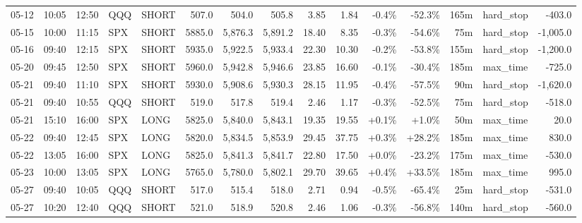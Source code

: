 \documentclass[11pt,a4paper,twoside]{article}
\begin{document}
\begin{landscape}
\begin{center}
\begin{longtable}{>{\color{txtmain}}l l l l l r r r r r r r r >{\color{txtmain}}l r}
05-12 & 10:05 & 12:50 & QQQ & SHORT & 507.0 & 504.0 & 505.8 & 3.85 & 1.84 & \textcolor{lossred}{-0.4\%} & \textcolor{lossred}{-52.3\%} & 165m & hard\_stop & \textcolor{lossred}{-403.0} \\
05-15 & 10:00 & 11:15 & SPX & SHORT & 5885.0 & 5,876.3 & 5,891.2 & 18.40 & 8.35 & \textcolor{lossred}{-0.3\%} & \textcolor{lossred}{-54.6\%} & 75m & hard\_stop & \textcolor{lossred}{-1,005.0} \\
05-16 & 09:40 & 12:15 & SPX & SHORT & 5935.0 & 5,922.5 & 5,933.4 & 22.30 & 10.30 & \textcolor{lossred}{-0.2\%} & \textcolor{lossred}{-53.8\%} & 155m & hard\_stop & \textcolor{lossred}{-1,200.0} \\
05-20 & 09:45 & 12:50 & SPX & SHORT & 5960.0 & 5,942.8 & 5,946.6 & 23.85 & 16.60 & \textcolor{lossred}{-0.1\%} & \textcolor{lossred}{-30.4\%} & 185m & max\_time & \textcolor{lossred}{-725.0} \\
05-21 & 09:40 & 11:10 & SPX & SHORT & 5930.0 & 5,908.6 & 5,930.3 & 28.15 & 11.95 & \textcolor{lossred}{-0.4\%} & \textcolor{lossred}{-57.5\%} & 90m & hard\_stop & \textcolor{lossred}{-1,620.0} \\
05-21 & 09:40 & 10:55 & QQQ & SHORT & 519.0 & 517.8 & 519.4 & 2.46 & 1.17 & \textcolor{lossred}{-0.3\%} & \textcolor{lossred}{-52.5\%} & 75m & hard\_stop & \textcolor{lossred}{-518.0} \\
05-21 & 15:10 & 16:00 & SPX & LONG & 5825.0 & 5,840.0 & 5,843.1 & 19.35 & 19.55 & \textcolor{wingreen}{+0.1\%} & \textcolor{wingreen}{+1.0\%} & 50m & max\_time & \textcolor{wingreen}{20.0} \\
05-22 & 09:40 & 12:45 & SPX & LONG & 5820.0 & 5,834.5 & 5,853.9 & 29.45 & 37.75 & \textcolor{wingreen}{+0.3\%} & \textcolor{wingreen}{+28.2\%} & 185m & max\_time & \textcolor{wingreen}{830.0} \\
05-22 & 13:05 & 16:00 & SPX & LONG & 5825.0 & 5,841.3 & 5,841.7 & 22.80 & 17.50 & \textcolor{wingreen}{+0.0\%} & \textcolor{lossred}{-23.2\%} & 175m & max\_time & \textcolor{lossred}{-530.0} \\
05-23 & 10:00 & 13:05 & SPX & LONG & 5765.0 & 5,780.0 & 5,802.1 & 29.70 & 39.65 & \textcolor{wingreen}{+0.4\%} & \textcolor{wingreen}{+33.5\%} & 185m & max\_time & \textcolor{wingreen}{995.0} \\
05-27 & 09:40 & 10:05 & QQQ & SHORT & 517.0 & 515.4 & 518.0 & 2.71 & 0.94 & \textcolor{lossred}{-0.5\%} & \textcolor{lossred}{-65.4\%} & 25m & hard\_stop & \textcolor{lossred}{-531.0} \\
05-27 & 10:20 & 12:40 & QQQ & SHORT & 521.0 & 518.9 & 520.8 & 2.46 & 1.06 & \textcolor{lossred}{-0.3\%} & \textcolor{lossred}{-56.8\%} & 140m & hard\_stop & \textcolor{lossred}{-560.0} \\

\end{longtable}
\end{center}
\end{landscape}
\end{document}

